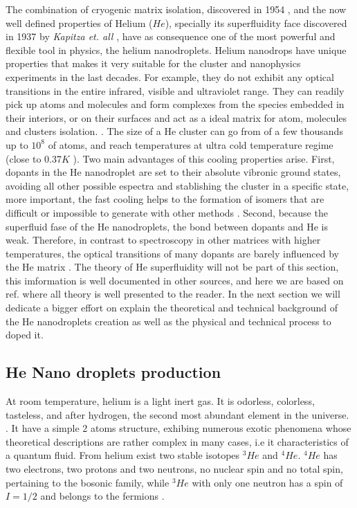 The combination of cryogenic matrix isolation, discovered in 1954 \cite{whittle_matrix_1954}, and the now well defined properties of Helium ($He$), specially its superfluidity face discovered in 1937 by \textit{Kapitza et. all}            \cite{kapitza_viscosity_1938}, have as consequence one of the most powerful and flexible tool in physics, the helium nanodroplets.
Helium nanodrops  have unique properties that makes it  very suitable for the cluster and nanophysics experiments in the last decades. For example, they do not exhibit any optical transitions in the entire infrared, visible and ultraviolet range. They can readily pick up atoms and molecules and  form complexes from the species embedded in their interiors, or on their surfaces and act as a ideal matrix for atom, molecules and clusters isolation. \cite{stienkemeier_spectroscopy_2006}\cite{toennies_superfluid_2004}.
The size of a He cluster can go from of a few thousands up to $10^{8}$ of atoms, and reach temperatures at   ultra cold temperature regime (close to 0.37$K$ \cite{toennies_spectroscopy_1998})\cite{enss_low-temperature_2005}.
Two main advantages of this  cooling properties arise. First,  dopants in the He nanodroplet are set to their absolute vibronic ground states, avoiding all other possible espectra and stablishing the cluster in a specific state, more important, the fast cooling helps to the formation of isomers that are difficult or impossible to generate with other methods \cite{nauta_nonequilibrium_1999}. Second, because the superfluid fase of the He nanodroplets\cite{grebenev_superfluidity_1998}, the bond between dopants and He is weak. Therefore, in contrast to spectroscopy in other matrices with higher temperatures, the optical transitions of many dopants are barely influenced by the He matrix \cite{toennies_superfluid_2004}. 
The theory of  He superfluidity will not be part of this section, this imformation is well documented in other sources, and here we are based on ref.\cite{enss_low-temperature_2005} where all theory is well presented to the reader. In the next section we will dedicate a bigger effort on explain the theoretical and technical background of the He nanodroplets creation as well as the physical and technical process to doped it. 

\subsection{He Nano droplets production}

At room temperature, helium is a light inert gas. It is odorless, colorless, tasteless, and after hydrogen, the second most abundant element in the universe.  \cite{enss_low-temperature_2005}. It have a simple 2 atoms structure, exhibing numerous exotic phenomena whose theoretical descriptions are rather complex in many cases, i.e it characteristics of  a quantum fluid. From helium exist  two stable isotopes $^{3}He$ and $^{4}He$.  $^{4}He$ has two electrons, two protons and two neutrons, no nuclear spin and no total spin, pertaining to the bosonic family, while $^{3}He$ with only one neutron has a spin of $I = 1/2$ and belongs to the fermions \cite{atkins_liquid_2014}.

